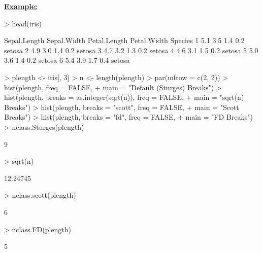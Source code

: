 \underline{\bf Example:}
%
\begin{Schunk}
\begin{Sinput}
> head(iris)
\end{Sinput}
\begin{Soutput}
  Sepal.Length Sepal.Width Petal.Length Petal.Width Species
1          5.1         3.5          1.4         0.2  setosa
2          4.9         3.0          1.4         0.2  setosa
3          4.7         3.2          1.3         0.2  setosa
4          4.6         3.1          1.5         0.2  setosa
5          5.0         3.6          1.4         0.2  setosa
6          5.4         3.9          1.7         0.4  setosa
\end{Soutput}
\begin{Sinput}
> plength <- iris[, 3]
> n <- length(plength)
> par(mfrow = c(2, 2))
> hist(plength, freq = FALSE,
+      main = "Default (Sturges) Breaks")
> hist(plength, breaks = as.integer(sqrt(n)), freq = FALSE,
+      main = "sqrt(n) Breaks")
> hist(plength, breaks = "scott", freq = FALSE,
+      main = "Scott Breaks")
> hist(plength, breaks = "fd", freq = FALSE,
+      main = "FD Breaks")
> nclass.Sturges(plength)
\end{Sinput}
\begin{Soutput}
[1] 9
\end{Soutput}
\begin{Sinput}
> sqrt(n)
\end{Sinput}
\begin{Soutput}
[1] 12.24745
\end{Soutput}
\begin{Sinput}
> nclass.scott(plength)
\end{Sinput}
\begin{Soutput}
[1] 6
\end{Soutput}
\begin{Sinput}
> nclass.FD(plength)
\end{Sinput}
\begin{Soutput}
[1] 5
\end{Soutput}
\end{Schunk}
